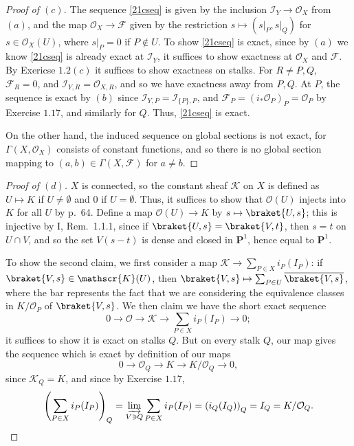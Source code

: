 \documentclass[10pt]{article}
\theoremstyle{definition}
\theoremstyle{remark}
\numberwithin{equation}{section}
\numberwithin{figure}{subsubsection}
\newcommand{\OO}{\mathcal{O}}
\begin{document}
\begin{proof}[Proof of $(c)$]
  The sequence \eqref{21cseq} is given by the inclusion $\mathscr{I}_Y \to
  \OO_X$ from $(a)$, and the map $\OO_X \to \mathscr{F}$ given by the
  restriction $s \mapsto (s\vert_P,s\vert_Q)$ for $s \in \OO_X(U)$, where
  $s\vert_P = 0$ if $P \notin U$. To show \eqref{21cseq} is exact, since by
  $(a)$ we know \eqref{21cseq} is already exact at $\mathscr{I}_Y$, it suffices
  to show exactness at $\OO_X$ and $\mathscr{F}$. By Exericse $1.2(c)$ it
  suffices to show exactness on stalks. For $R \ne P,Q$, $\mathscr{F}_R = 0$,
  and $\mathscr{I}_{Y,R} = \OO_{X,R}$, and so we have exactness away from $P,Q$.
  At $P$, the sequence is exact by $(b)$ since $\mathscr{I}_{Y,P} =
  \mathscr{I}_{\{P\},P}$, and $\mathscr{F}_P = (i_*\OO_P)_P = \OO_P$ by Exercise $1.17$, and similarly for $Q$. Thus, \eqref{21cseq} is exact.
  \par On the other hand, the induced sequence on global sections is not exact, for $\Gamma(X,\OO_X)$ consists of constant functions, and so there is no global section mapping to $(a,b) \in \Gamma(X,\mathscr{F})$ for $a \ne b$.
\end{proof}
\begin{proof}[Proof of $(d)$]
  $X$ is connected, so the constant sheaf $\mathscr{K}$ on $X$ is defined as $U
  \mapsto K$ if $U \ne \emptyset$ and $0$ if $U = \emptyset$.
  Thus, it suffices to show that $\OO(U)$ injects into $K$ for all $U$ by p.~64. Define a map $\OO(U) \to K$ by $s \mapsto \braket{U,s}$; this is injective by I, Rem.~1.1.1, since if $\braket{U,s} = \braket{V,t}$, then $s=t$ on $U \cap V$, and so the set $V(s-t)$ is dense and closed in $\mathbf{P}^1$, hence equal to $\mathbf{P}^1$. 
  \par To show the second claim, we first consider a map $\mathscr{K} \to
  \sum_{P \in X} i_P(I_P)$: if $\braket{V,s} \in \mathscr{K}(U)$, then $\braket{V,s} 
  \mapsto \sum_{P \in U} \overline{\braket{V,s}}$, where the bar represents the
  fact that we are considering the equivalence classes in $K/\OO_P$ of
  $\braket{V,s}$. We then claim we have the short exact sequence
  \begin{equation*}
    0 \to \OO \to \mathscr{K} \to \sum_{P \in X} i_P(I_P) \to 0;
  \end{equation*}
  it suffices to show it is exact on stalks $Q$. But on every stalk $Q$, our map
  gives the sequence which is exact by definition of our maps
  \begin{equation*}
    0 \to \OO_Q \to K \to K/\OO_Q \to 0,
  \end{equation*}
  since $\mathscr{K}_Q = K$, and since by Exercise $1.17$,
  \begin{equation*}
    \left( \sum_{P \in X} i_P(I_P) \right)_Q = \varinjlim_{V \ni Q} \sum_{P \in X} i_P(I_P) = \left(i_Q(I_Q)\right)_Q = I_Q = K/\OO_Q.\qedhere
  \end{equation*}
\end{proof}
\end{document}
